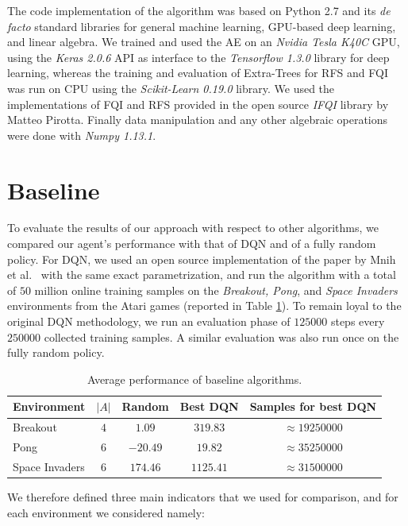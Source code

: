 The code implementation of the algorithm was based on Python 2.7 and its 
\textit{de facto} standard libraries for general machine learning, GPU-based 
deep learning, and linear algebra. 
We trained and used the AE on an \textit{Nvidia Tesla K40C} GPU, using the 
\textit{Keras 2.0.6} API as interface to the \textit{Tensorflow 1.3.0} library 
for deep learning, whereas the training and evaluation of Extra-Trees 
for RFS and FQI was run on CPU using the \textit{Scikit-Learn 0.19.0} library.
We used the implementations of FQI and RFS provided in the open source 
\textit{IFQI} library by Matteo Pirotta.
Finally data manipulation and any other algebraic operations were done with 
\textit{Numpy 1.13.1}.

\section{Baseline}\label{s:exp_baseline}
To evaluate the results of our approach with respect to other algorithms, we 
compared our agent's performance with that of DQN and of a fully random policy. 
For DQN, we used an open source implementation of the paper by Mnih et al.\ \cite{mnih2015human} 
with the same exact parametrization, and run the algorithm with a total of $50$ 
million online training samples on the \textit{Breakout, Pong}, and \textit{Space 
Invaders} environments from the Atari games (reported in Table \ref{t:envs_used}).
To remain loyal to the original DQN methodology, we run an evaluation phase 
of $125000$ steps every $250000$ collected training samples. A similar 
evaluation was also run once on the fully random policy.
%
\begin{table}
    \centering
    \begin{tabular}{l c c c c} 
	\hline
	Environment    & $|A|$ & Random   & Best DQN  & Samples for best DQN \\ 
	\hline 
	Breakout       & $4$   & $1.09$   & $319.83$  & $\approx19250000$ \\
	Pong           & $6$   & $-20.49$ & $19.82$   & $\approx35250000$ \\
	Space Invaders & $6$   & $174.46$ & $1125.41$ & $\approx31500000$ \\
	\hline
    \end{tabular}
    \caption[Performance of baseline algorithms]{Average performance of baseline
	     algorithms.}
    \label{t:envs_used}
\end{table}
%
We therefore defined three main indicators that we used for comparison, and for 
each environment we considered namely:
